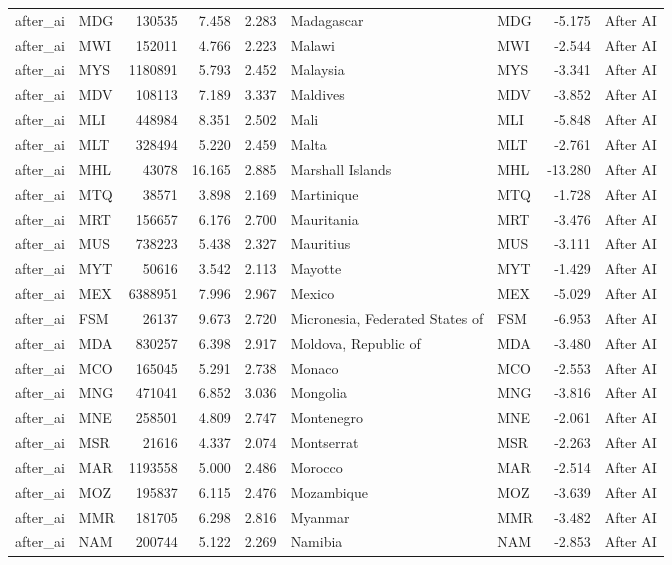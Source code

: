 \begin{tabular}{llrrrllrl}
after\_ai & MDG & 130535 & 7.458 & 2.283 & Madagascar & MDG & -5.175 & After AI \\
after\_ai & MWI & 152011 & 4.766 & 2.223 & Malawi & MWI & -2.544 & After AI \\
after\_ai & MYS & 1180891 & 5.793 & 2.452 & Malaysia & MYS & -3.341 & After AI \\
after\_ai & MDV & 108113 & 7.189 & 3.337 & Maldives & MDV & -3.852 & After AI \\
after\_ai & MLI & 448984 & 8.351 & 2.502 & Mali & MLI & -5.848 & After AI \\
after\_ai & MLT & 328494 & 5.220 & 2.459 & Malta & MLT & -2.761 & After AI \\
after\_ai & MHL & 43078 & 16.165 & 2.885 & Marshall Islands & MHL & -13.280 & After AI \\
after\_ai & MTQ & 38571 & 3.898 & 2.169 & Martinique & MTQ & -1.728 & After AI \\
after\_ai & MRT & 156657 & 6.176 & 2.700 & Mauritania & MRT & -3.476 & After AI \\
after\_ai & MUS & 738223 & 5.438 & 2.327 & Mauritius & MUS & -3.111 & After AI \\
after\_ai & MYT & 50616 & 3.542 & 2.113 & Mayotte & MYT & -1.429 & After AI \\
after\_ai & MEX & 6388951 & 7.996 & 2.967 & Mexico & MEX & -5.029 & After AI \\
after\_ai & FSM & 26137 & 9.673 & 2.720 & Micronesia, Federated States of & FSM & -6.953 & After AI \\
after\_ai & MDA & 830257 & 6.398 & 2.917 & Moldova, Republic of & MDA & -3.480 & After AI \\
after\_ai & MCO & 165045 & 5.291 & 2.738 & Monaco & MCO & -2.553 & After AI \\
after\_ai & MNG & 471041 & 6.852 & 3.036 & Mongolia & MNG & -3.816 & After AI \\
after\_ai & MNE & 258501 & 4.809 & 2.747 & Montenegro & MNE & -2.061 & After AI \\
after\_ai & MSR & 21616 & 4.337 & 2.074 & Montserrat & MSR & -2.263 & After AI \\
after\_ai & MAR & 1193558 & 5.000 & 2.486 & Morocco & MAR & -2.514 & After AI \\
after\_ai & MOZ & 195837 & 6.115 & 2.476 & Mozambique & MOZ & -3.639 & After AI \\
after\_ai & MMR & 181705 & 6.298 & 2.816 & Myanmar & MMR & -3.482 & After AI \\
after\_ai & NAM & 200744 & 5.122 & 2.269 & Namibia & NAM & -2.853 & After AI \\

\end{tabular}
